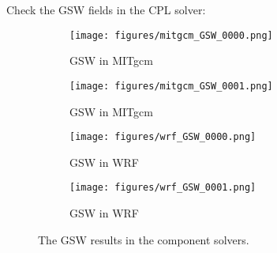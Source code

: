 
Check the GSW fields in the CPL solver:

\begin{figure}[h!]
\centering
  \begin{subfigure}[b]{0.45\linewidth}
  \texttt{[image: figures/mitgcm\_GSW\_0000.png]}
  \caption{GSW in MITgcm}
  \end{subfigure}
  \begin{subfigure}[b]{0.45\linewidth}
  \texttt{[image: figures/mitgcm\_GSW\_0001.png]}
  \caption{GSW in MITgcm}
  \end{subfigure}
  \hspace{0.1in}
  \begin{subfigure}[b]{0.45\linewidth}
  \texttt{[image: figures/wrf\_GSW\_0000.png]}
  \caption{GSW in WRF}
  \end{subfigure}
  \begin{subfigure}[b]{0.45\linewidth}
  \texttt{[image: figures/wrf\_GSW\_0001.png]}
  \caption{GSW in WRF}
  \end{subfigure}
\caption{The GSW results in the component solvers.}
\label{fig:gsw}
\end{figure}
